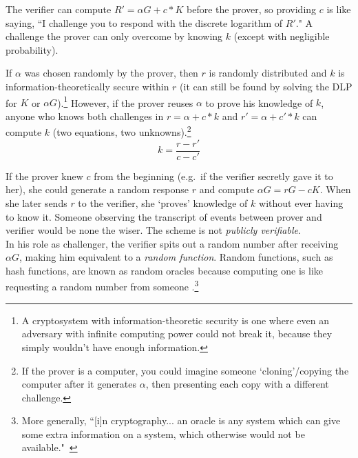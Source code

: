 The verifier can compute $R' = \alpha G + c*K$ before the prover, so providing $c$ is like saying, ``I challenge you to respond with the discrete logarithm of $R'$." A challenge the prover can only overcome by knowing $k$ (except with negligible probability).

If $\alpha$ was chosen randomly by the prover, then $r$ is randomly distributed \cite{SCOZZAFAVA1993313} and $k$ is information-theoretically secure within $r$ (it can still be found by solving the DLP for $K$ or $\alpha G$).\footnote{\label{information_theoretic_note}A cryptosystem with information-theoretic security is one where even an adversary with infinite computing power could not break it, because they simply wouldn't have enough information.} However, if the prover reuses $\alpha$ to prove his knowledge of $k$, anyone who knows both challenges in $r = \alpha + c*k$ and $r' = \alpha + c'*k$ can compute $k$ (two equations, two unknowns).\footnote{If the prover is a computer, you could imagine someone `cloning'/copying the computer after it generates $\alpha$, then presenting each copy with a different challenge.}\vspace{.175cm}%
\[k = \frac{r-r'}{c-c'}\]

If the prover knew $c$ from the beginning (e.g.\ if the verifier secretly gave it to her), she could generate a random response $r$ and compute $\alpha G = r G - c K$. When she later sends $r$ to the verifier, she `proves' knowledge of $k$ without ever having to know it. Someone observing the transcript of events between prover and verifier would be none the wiser. The scheme is not {\em publicly verifiable}.~\cite{Signatures2015BorromeanRS}\\

In his role as challenger, the verifier spits out a random number after receiving $\alpha G$, making him equivalent to a {\em random function}. Random functions, such as hash functions, are known as random oracles because computing one is like requesting a random number from someone \cite{Signatures2015BorromeanRS}.\footnote{More generally, ``[i]n cryptography... an oracle is any system which can give some extra information on a system, which otherwise would not be available."~\cite{cryptographic-oracle}}\\

